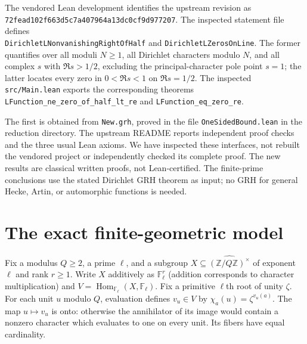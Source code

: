 \documentclass[11pt]{article}
\theoremstyle{remark}\newtheorem{remark}[theorem]{Remark}
\newcommand{\F}{\mathbb F}
\newcommand{\Z}{\mathbb Z}
\newcommand{\1}{\mathbf 1}
\begin{document}
The vendored Lean development \cite{vendor} identifies the upstream revision as\\ \texttt{72fead102f663d5c7a407964a13dc0cf9d977207}. The inspected statement file defines\\ \texttt{DirichletLNonvanishingRightOfHalf} and \texttt{DirichletLZerosOnLine}. The former quantifies over all moduli $N\ge1$, all Dirichlet characters modulo $N$, and all complex $s$ with $\Re s>1/2$, excluding the principal-character pole point $s=1$; the latter locates every zero in $0<\Re s<1$ on $\Re s=1/2$. The inspected \texttt{src/Main.lean} exports the corresponding theorems \texttt{LFunction\_ne\_zero\_of\_half\_lt\_re} and \texttt{LFunction\_eq\_zero\_re}.\par The first is obtained from \texttt{New.grh}, proved in the file \texttt{OneSidedBound.lean} in the reduction directory. The upstream README reports independent proof checks and the three usual Lean axioms. We have inspected these interfaces, not rebuilt the vendored project or independently checked its complete proof. The new results are classical written proofs, not Lean-certified. The finite-prime conclusions use the stated Dirichlet GRH theorem as input; no GRH for general Hecke, Artin, or automorphic functions is needed.

\section{The exact finite-geometric model}
Fix a modulus $Q\ge 2$, a prime $\ell$, and a subgroup $X\subseteq\widehat{(\Z/Q\Z)^\times}$ of exponent $\ell$ and rank $r\ge1$. Write $X$ additively as $\F_\ell^r$ (addition corresponds to character multiplication) and $V=\operatorname{Hom}_{\F_\ell}(X,\F_\ell)$. Fix a primitive $\ell$th root of unity $\zeta$. For each unit $u$ modulo $Q$, evaluation defines $v_u\in V$ by $\chi_a(u)=\zeta^{v_u(a)}$. The map $u\mapsto v_u$ is onto: otherwise the annihilator of its image would contain a nonzero character which evaluates to one on every unit. Its fibers have equal cardinality.
\end{document}
